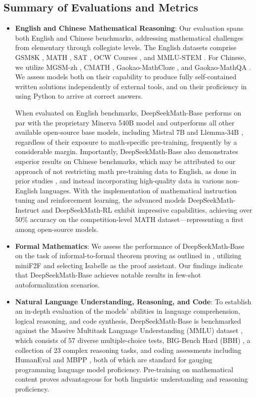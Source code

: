\subsection{Summary of Evaluations and Metrics}

\begin{itemize}[topsep=0pt]
    \item \textbf{English and Chinese Mathematical Reasoning}: Our evaluation spans both English and Chinese benchmarks, addressing mathematical challenges from elementary through collegiate levels. The English datasets comprise GSM8K \citep{gsm8k}, MATH \citep{MATH}, SAT \citep{llemma}, OCW Courses \citep{minerva}, and MMLU-STEM \citep{mmlu}. For Chinese, we utilize MGSM-zh \citep{mgsm}, CMATH \citep{wei2023cmath}, Gaokao-MathCloze \citep{agieval}, and Gaokao-MathQA \citep{agieval}. We assess models both on their capability to produce fully self-contained written solutions independently of external tools, and on their proficiency in using Python to arrive at correct answers.

When evaluated on English benchmarks, DeepSeekMath-Base performs on par with the proprietary Minerva 540B model \citep{minerva} and outperforms all other available open-source base models, including Mistral 7B \citep{mistral} and Llemma-34B \citep{llemma}, regardless of their exposure to math-specific pre-training, frequently by a considerable margin. Importantly, DeepSeekMath-Base also demonstrates superior results on Chinese benchmarks, which may be attributed to our approach of not restricting math pre-training data to English, as done in prior studies \citep{minerva,llemma}, and instead incorporating high-quality data in various non-English languages. With the implementation of mathematical instruction tuning and reinforcement learning, the advanced models DeepSeekMath-Instruct and DeepSeekMath-RL exhibit impressive capabilities, achieving over 50\% accuracy on the competition-level MATH dataset—representing a first among open-source models.

\item \textbf{Formal Mathematics}: We assess the performance of DeepSeekMath-Base on the task of informal-to-formal theorem proving as outlined in \citep{dsp_proof}, utilizing miniF2F \citep{minif2f} and selecting Isabelle \citep{isabelle} as the proof assistant. Our findings indicate that DeepSeekMath-Base achieves notable results in few-shot autoformalization scenarios.
\item \textbf{Natural Language Understanding, Reasoning, and Code}: To establish an in-depth evaluation of the models’ abilities in language comprehension, logical reasoning, and code synthesis, DeepSeekMath-Base is benchmarked against the Massive Multitask Language Understanding (MMLU) dataset \citep{mmlu}, which consists of 57 diverse multiple-choice tests, BIG-Bench Hard (BBH) \citep{bbh}, a collection of 23 complex reasoning tasks, and coding assessments including HumanEval \citep{codex} and MBPP \citep{mbpp}, both of which are standard for gauging programming language model proficiency. Pre-training on mathematical content proves advantageous for both linguistic understanding and reasoning proficiency.


\end{itemize}
